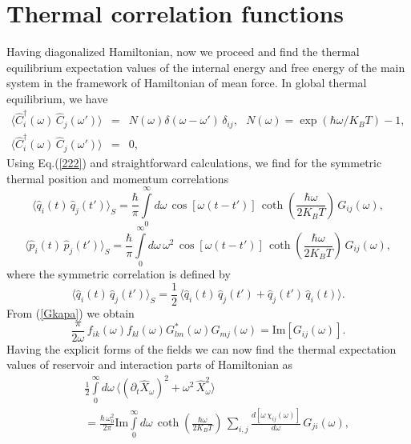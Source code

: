 \documentclass[preprint,showpacs,showkeys,groupedaddress,superscriptaddress]{revtex4}
\begin{document}
\section{Thermal correlation functions}
\noindent
Having diagonalized Hamiltonian, now we proceed and find the thermal equilibrium expectation values of the internal energy and free energy of the main system in the framework of Hamiltonian of mean force. In global thermal equilibrium, we have
\begin{eqnarray}\label{222}
\langle \hat C_i^{\dag} (\omega )\,\hat C_j (\omega')\rangle  &=&  N(\omega )\delta (\omega-\omega')\,\delta _{ij} ,\,\,\,\,
N(\omega)=\exp (\hbar\omega/K_B T)-1, \\
 \langle \hat C_i^{\dag}  (\omega )\,\hat C_j (\omega')\rangle  &=& 0,
\end{eqnarray}
Using Eq.(\ref{222}) and straightforward calculations, we find for the symmetric thermal position and momentum correlations
\begin{equation}\label{stp}
  \langle \hat q_i(t)\,\hat q_j(t')\rangle_S= \frac{\hbar}{\pi}\int\limits_0^\infty d\omega\,\cos[\omega (t - t')]\,\coth \left(\frac{\hbar\omega}{2K_B T}\right)\,G_{ij} (\omega),
\end{equation}
\begin{equation}\label{stm}
\langle \hat p_i(t)\,\hat p_j(t')\rangle_S  = \frac{\hbar}{\pi}\int\limits_0^\infty  d\omega\,\omega^2\,
\cos[\omega (t - t')]\,\coth \left(\frac{\hbar\omega}{2K_B T}\right)\,G_{ij} (\omega),
\end{equation}
where the symmetric correlation is defined by
\begin{equation}\label{symcorr}
  \langle \hat q_i(t)\,\hat q_j(t')\rangle_S=\frac{1}{2}\,\langle \hat q_i(t)\,\hat q_j(t') + \hat q_j(t')\,\hat q_i(t)\rangle.
\end{equation}
From (\ref{Gkapa}) we obtain
\begin{equation}
 \frac{\pi}{2\omega}\,f_{ik} (\omega) f_{kl} (\omega) G_{lm}^* (\omega) G_{mj} (\omega)=\mbox{Im} [G_{ij} (\omega)].
\end{equation}
Having the explicit forms of the fields we can now find the thermal expectation values of reservoir and interaction parts of Hamiltonian as
\begin{eqnarray}
 && \frac{1}{2}\int\limits_0^\infty d\omega \,\langle (\partial_t \hat X_\omega )^2  + \omega^2 \,\hat X_\omega^2 \rangle\nonumber\\
 && = \frac{\hbar \,\omega_0^2}{2\pi}\mbox{Im} \int\limits_0^\infty d\omega\, \coth \left(\frac{\hbar \omega}{2K_B T}\right)\,\sum\limits_{i,j}
 \frac{d[\omega \,\chi_{ij} (\omega )]}{d\omega}\, G_{ji} (\omega ),
\end{eqnarray}
\end{document}
